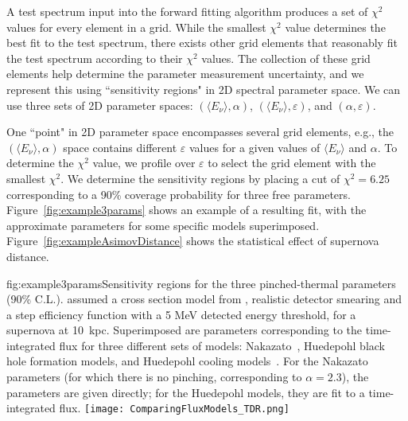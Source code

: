 

A test spectrum input into the forward fitting algorithm produces a set of $\chi^2$ values for every element in a grid. While the smallest $\chi^2$ value determines the best fit to the test spectrum, there exists other grid elements that reasonably fit the test spectrum according to their $\chi^2$ values. The collection of these grid elements help determine the parameter measurement uncertainty, and we represent this using ``sensitivity regions" in 2D spectral parameter space. We can use three sets of 2D parameter spaces: $(\langle E_\nu \rangle, \alpha)$, $(\langle E_\nu \rangle, \varepsilon)$, and $(\alpha, \varepsilon)$.

One ``point" in 2D parameter space encompasses several grid elements,
e.g., the $(\langle E_\nu \rangle, \alpha)$ space contains different
$\varepsilon$ values for a given values of $\langle E_\nu \rangle$ and
$\alpha$. To determine the $\chi^2$ value, we profile over
$\varepsilon$ to select the grid element with the smallest
$\chi^2$. We determine the sensitivity regions by placing a cut of
$\chi^2 = 6.25$ corresponding to a 90\% coverage probability for three
free parameters.
Figure~\ref{fig:example3params} shows an example of a resulting fit,
with the approximate parameters for some specific models
superimposed.  Figure~\ref{fig:exampleAsimovDistance} shows the
statistical effect of supernova distance.

\begin{dunefigure}{fig:example3params}{Sensitivity regions for the three
    pinched-thermal parameters (90\% C.L.).
   assumed a cross section
    model from , realistic detector smearing and a step efficiency function with a 5 MeV
    detected energy threshold, for a supernova at 10~kpc. Superimposed
  are parameters corresponding to the time-integrated flux for three different sets of models:
  Nakazato~\cite{Nakazato:2012qf}, Huedepohl black hole formation models, and Huedepohl
  cooling models~\cite{huedepohldb}.  For the Nakazato parameters (for which there is no
  pinching, corresponding to $\alpha=2.3$), the parameters are
  given directly; for the Huedepohl models, they are fit to a
  time-integrated flux.}
	\texttt{[image: ComparingFluxModels\_TDR.png]}
  \end{dunefigure}

